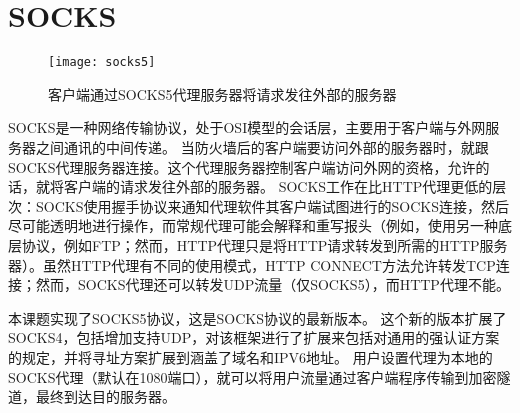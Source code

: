 \section{SOCKS}
\begin{figure}[H]
  \centering
  \texttt{[image: socks5]}
  \caption{客户端通过SOCKS5代理服务器将请求发往外部的服务器}
\end{figure}

SOCKS是一种网络传输协议，处于OSI模型的会话层，主要用于客户端与外网服务器之间通讯的中间传递。
当防火墙后的客户端要访问外部的服务器时，就跟SOCKS代理服务器连接。这个代理服务器控制客户端访问外网的资格，允许的话，就将客户端的请求发往外部的服务器。
SOCKS工作在比HTTP代理更低的层次：SOCKS使用握手协议来通知代理软件其客户端试图进行的SOCKS连接，然后尽可能透明地进行操作，而常规代理可能会解释和重写报头（例如，使用另一种底层协议，例如FTP；然而，HTTP代理只是将HTTP请求转发到所需的HTTP服务器）。虽然HTTP代理有不同的使用模式，HTTP CONNECT方法允许转发TCP连接；然而，SOCKS代理还可以转发UDP流量（仅SOCKS5），而HTTP代理不能。

本课题实现了SOCKS5协议，这是SOCKS协议的最新版本。
这个新的版本扩展了SOCKS4，包括增加支持UDP，对该框架进行了扩展来包括对通用的强认证方案的规定，并将寻址方案扩展到涵盖了域名和IPV6地址。
用户设置代理为本地的SOCKS代理（默认在1080端口），就可以将用户流量通过客户端程序传输到加密隧道，最终到达目的服务器。
